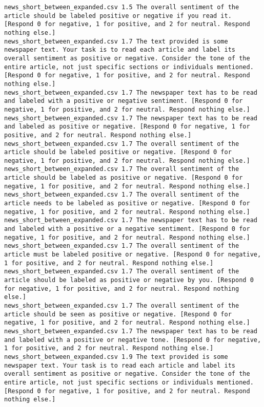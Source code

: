 \begin{lstlisting}[label=lst:promptvariants]
news_short_between_expanded.csv	1.5	The overall sentiment of the article should be labeled positive or negative if you read it. [Respond 0 for negative, 1 for positive, and 2 for neutral. Respond nothing else.]
news_short_between_expanded.csv	1.7	The text provided is some newspaper text. Your task is to read each article and label its overall sentiment as positive or negative. Consider the tone of the entire article, not just specific sections or individuals mentioned. [Respond 0 for negative, 1 for positive, and 2 for neutral. Respond nothing else.]
news_short_between_expanded.csv	1.7	The newspaper text has to be read and labeled with a positive or negative sentiment. [Respond 0 for negative, 1 for positive, and 2 for neutral. Respond nothing else.]
news_short_between_expanded.csv	1.7	The newspaper text has to be read and labeled as positive or negative. [Respond 0 for negative, 1 for positive, and 2 for neutral. Respond nothing else.]
news_short_between_expanded.csv	1.7	The overall sentiment of the article should be labeled positive or negative. [Respond 0 for negative, 1 for positive, and 2 for neutral. Respond nothing else.]
news_short_between_expanded.csv	1.7	The overall sentiment of the article should be labeled as positive or negative. [Respond 0 for negative, 1 for positive, and 2 for neutral. Respond nothing else.]
news_short_between_expanded.csv	1.7	The overall sentiment of the article needs to be labeled as positive or negative. [Respond 0 for negative, 1 for positive, and 2 for neutral. Respond nothing else.]
news_short_between_expanded.csv	1.7	The newspaper text has to be read and labeled with a positive or a negative sentiment. [Respond 0 for negative, 1 for positive, and 2 for neutral. Respond nothing else.]
news_short_between_expanded.csv	1.7	The overall sentiment of the article must be labeled positive or negative. [Respond 0 for negative, 1 for positive, and 2 for neutral. Respond nothing else.]
news_short_between_expanded.csv	1.7	The overall sentiment of the article should be labeled as positive or negative by you. [Respond 0 for negative, 1 for positive, and 2 for neutral. Respond nothing else.]
news_short_between_expanded.csv	1.7	The overall sentiment of the article should be seen as positive or negative. [Respond 0 for negative, 1 for positive, and 2 for neutral. Respond nothing else.]
news_short_between_expanded.csv	1.7	The newspaper text has to be read and labeled with a positive or negative tone. [Respond 0 for negative, 1 for positive, and 2 for neutral. Respond nothing else.]
news_short_between_expanded.csv	1.9	The text provided is some newspaper text. Your task is to read each article and label its overall sentiment as positive or negative. Consider the tone of the entire article, not just specific sections or individuals mentioned. [Respond 0 for negative, 1 for positive, and 2 for neutral. Respond nothing else.]

\end{lstlisting}
